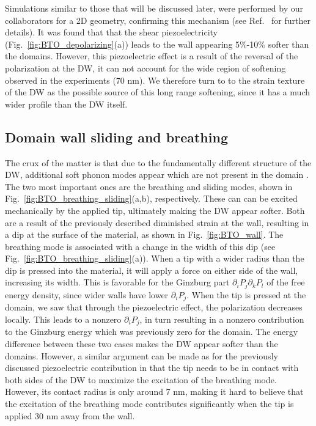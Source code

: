 Simulations similar to those that will be discussed later, were performed by our collaborators for a 2D geometry, confirming this mechanism (see Ref.~\cite{Stefani2020} for further details).
It was found that that the shear piezoelectricity (Fig.~\ref{fig:BTO_depolarizing}(a)) leads to the wall appearing 5\%-10\% softer than the domains.
However, this piezoelectric effect is a result of the reversal of the polarization at the DW, it can not account for the wide region of softening observed in the experiments (70 nm).
We therefore turn to to the strain texture of the DW as the possible source of this long range softening, since it has a much wider profile than the DW itself.

\subsection{Domain wall sliding and breathing}
The crux of the matter is that due to the fundamentally different structure of the DW, additional soft phonon modes appear which are not present in the domain \cite{Chen2020}.
The two most important ones are the breathing and sliding modes, shown in Fig.~\ref{fig:BTO_breathing_sliding}(a,b), respectively.
These can can be excited mechanically by the applied tip, ultimately making the DW appear softer.
Both are a result of the previously described diminished strain at the wall, resulting in a dip at the surface of the material, as shown in Fig.~\ref{fig:BTO_wall}.
The breathing mode is associated with a change in the width of this dip (see Fig.~\ref{fig:BTO_breathing_sliding}(a)).
When a tip with a wider radius than the dip is pressed into the material, it will apply a force on either side of the wall, increasing its width.
This is favorable for the Ginzburg part $\partial_i P_j \partial_k P_l$ of the free energy density, since wider walls have lower $\partial_i P_j$.
When the tip is pressed at the domain, we saw that through the piezoelectric effect, the polarization decreases locally.
This leads to a nonzero $\partial_i P_j$, in turn resulting in a nonzero contribution to the Ginzburg energy which was previously zero for the domain.
The energy difference between these two cases makes the DW appear softer than the domains.
However, a similar argument can be made as for the previously discussed piezoelectric contribution in that the tip needs to be in contact with both sides of the DW to maximize the excitation of the breathing mode.
However, its contact radius is only around 7 nm, making it hard to believe that the excitation of the breathing mode contributes significantly when the tip is applied 30 nm away from the wall.
